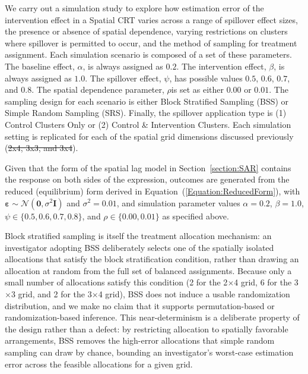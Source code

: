 \documentclass{article}[11pt]
\makeatletter
\providecommand{\DIFaddtex}[1]{{\protect\color{blue}\uwave{#1}}} %
\providecommand{\DIFdeltex}[1]{{\protect\color{red}\sout{#1}}} %
\providecommand{\DIFaddbegin}{} %
\providecommand{\DIFaddend}{} %
\providecommand{\DIFdelbegin}{} %
\providecommand{\DIFdelend}{} %
\providecommand{\DIFadd}[1]{\texorpdfstring{\DIFaddtex{#1}}{#1}} %
\providecommand{\DIFdel}[1]{\texorpdfstring{\DIFdeltex{#1}}{}} %
\providecommand{\DIFscaledelfig}{0.5}
\newlength{\DIFdelgraphicswidth} %
\newlength{\DIFdelgraphicsheight} %
\providecommand{\DIFaddincludegraphics}[2][]{{\color{blue}\fbox{\DIFOincludegraphics[#1]{#2}}}} %
\providecommand{\DIFdelincludegraphics}[2][]{%
\sbox{\DIFdelgraphicsbox}{\DIFOincludegraphics[#1]{#2}}%
\settoboxwidth{\DIFdelgraphicswidth}{\DIFdelgraphicsbox} %
\settoboxtotalheight{\DIFdelgraphicsheight}{\DIFdelgraphicsbox} %
\scalebox{\DIFscaledelfig}{%
\parbox[b]{\DIFdelgraphicswidth}{\usebox{\DIFdelgraphicsbox}\\[-\baselineskip] \rule{\DIFdelgraphicswidth}{0em}}\llap{\resizebox{\DIFdelgraphicswidth}{\DIFdelgraphicsheight}{%
\setlength{\unitlength}{\DIFdelgraphicswidth}%
\begin{picture}(1,1)%
\thicklines\linethickness{2pt} %
{\color[rgb]{1,0,0}\put(0,0){\framebox(1,1){}}}%
{\color[rgb]{1,0,0}\put(0,0){\line( 1,1){1}}}%
{\color[rgb]{1,0,0}\put(0,1){\line(1,-1){1}}}%
\end{picture}%
}\hspace*{3pt}}} %
} %
\DeclareRobustCommand{\DIFaddbegin}{\DIFOaddbegin \let\includegraphics\DIFaddincludegraphics} %
\DeclareRobustCommand{\DIFaddend}{\DIFOaddend \let\includegraphics\DIFOincludegraphics} %
\DeclareRobustCommand{\DIFdelbegin}{\DIFOdelbegin \let\includegraphics\DIFdelincludegraphics} %
\DeclareRobustCommand{\DIFdelend}{\DIFOaddend \let\includegraphics\DIFOincludegraphics} %
\let\sout@orig\sout %
\renewcommand{\sout}[1]{\ifmmode\text{\sout@orig{\ensuremath{#1}}}\else\sout@orig{#1}\fi} %
\makeatother
\begin{document}
We carry out a simulation study to explore how estimation error of the intervention effect in a Spatial CRT varies across a range of spillover effect sizes, the presence or absence of spatial dependence, varying restrictions on clusters where spillover is permitted to occur, and the method of sampling for treatment assignment. Each simulation scenario is composed of a set of these parameters. The baseline effect, $\alpha$, is always assigned as $0.2$. The intervention effect, $\beta$, is always assigned as $1.0$. The spillover effect, $\psi$, has possible values $0.5$, $0.6$, $0.7$, and $0.8$. The spatial dependence parameter, $\rho$\DIFaddbegin \DIFadd{, }\DIFaddend is set as either $0.00$ or $0.01$. The sampling design for each scenario is either Block Stratified Sampling (BSS) or Simple Random Sampling (SRS). Finally, the spillover application type is (1) Control Clusters Only or (2) Control \& Intervention Clusters. Each simulation setting is replicated for each of the spatial grid dimensions discussed previously (\DIFdelbegin \DIFdel{2x4, 3x3, and 3x4}\DIFdelend \DIFaddbegin \DIFadd{$2\times4$, $3\times3$, and $3\times4$}\DIFaddend ).

Given that the form of the spatial lag model in Section~\ref{section:SAR} contains the response on both sides of the expression, outcomes are generated from the reduced (equilibrium) form derived in Equation~(\ref{Equation:ReducedForm})\cite{fotheringham_sage_2009}\cite{baltagi_spatial_2003}, with $\boldsymbol\varepsilon \sim \mathcal{N}(\mathbf{0}, \sigma^2\mathbf{I})$ and $\sigma^2 = 0.01$, and simulation parameter values $\alpha = 0.2$, $\beta = 1.0$, $\psi \in \{0.5, 0.6, 0.7, 0.8\}$, and $\rho \in \{0.00, 0.01\}$ as specified above.


Block stratified sampling is itself the treatment allocation mechanism: an investigator adopting BSS deliberately selects one of the spatially isolated allocations that satisfy the block stratification condition, rather than drawing an allocation at random from the full set of balanced assignments. Because only a small number of allocations satisfy this condition (2 for the 2$\times$4 grid, 6 for the 3$\times$3 grid, and 2 for the 3$\times$4 grid), BSS does not induce a usable randomization distribution, and we make no claim that it supports permutation-based or randomization-based inference. This near-determinism is a deliberate property of the design rather than a defect: by restricting allocation to spatially favorable arrangements, BSS removes the high-error allocations that simple random sampling can draw by chance, bounding an investigator's worst-case estimation error across the feasible allocations for a given grid.
\end{document}
